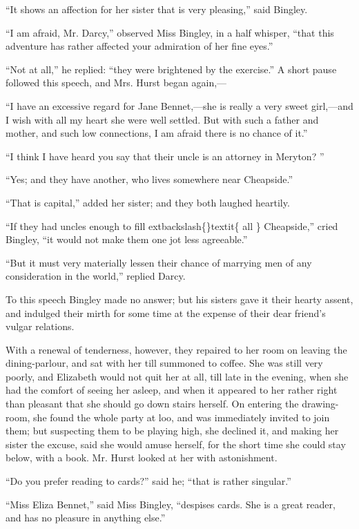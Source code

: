 \documentclass[10pt]{book}
\begin{document}
   “It shows an affection for her sister that is very pleasing,” said
Bingley.
  

   “I am afraid, Mr. Darcy,” observed Miss Bingley, in a half whisper,
“that this adventure has rather affected your admiration of her fine
eyes.”
  

   “Not at all,” he replied: “they were brightened by the exercise.” A
short pause followed this speech, and Mrs. Hurst began again,—
  

   “I have an excessive regard for Jane Bennet,—she is really a very sweet
girl,—and I wish with all my heart she were well settled. But with such
a father and mother, and such low connections, I am afraid there is no
chance of it.”
  

   “I think I have heard you say that their uncle is an attorney in
Meryton?
   ”
  

   “Yes; and they have another, who lives somewhere near Cheapside.”
  

   “That is capital,” added her sister; and they both laughed heartily.
  

   “If they had uncles enough to fill
   	extbackslash\{\}textit\{
    all
   \}
   Cheapside,” cried Bingley, “it
would not make them one jot less agreeable.”
  

   “But it must very materially lessen their chance of marrying men of any
consideration in the world,” replied Darcy.
  

   To this speech Bingley made no answer; but his sisters gave it their
hearty assent, and indulged their mirth for some time at the expense of
their dear friend’s vulgar relations.
  

   With a renewal of tenderness, however, they repaired to her room on
leaving the dining-parlour, and sat with her till summoned to coffee.
She was still very poorly, and Elizabeth would not quit her at all, till
late in the evening, when she had the comfort of seeing her asleep, and
when it appeared to her rather right than pleasant that she should go
down stairs herself. On entering the drawing-room, she found the whole
party at loo, and was immediately invited to join them; but suspecting
them to be playing high, she declined it, and making her sister the
excuse, said she would amuse herself, for the short time she could stay
below, with a book. Mr. Hurst looked at her with astonishment.
  

   “Do you prefer reading to cards?” said he; “that is rather singular.”
  

   “Miss Eliza Bennet,” said Miss Bingley, “despises cards. She is a great
reader, and has no pleasure in anything else.”
  
\end{document}

